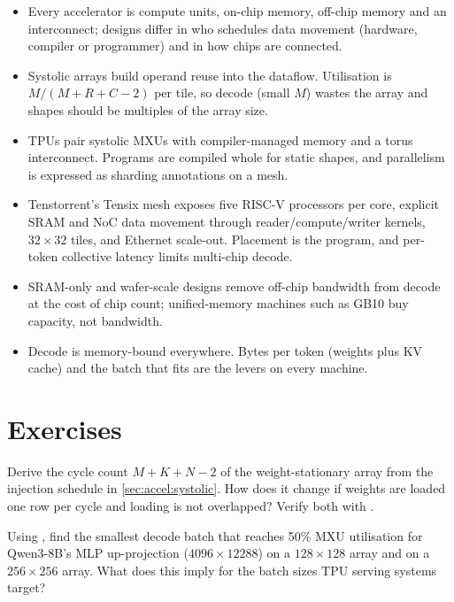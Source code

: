\begin{itemize}
  \item Every accelerator is compute units, on-chip memory, off-chip memory and an interconnect;
    designs differ in who schedules data movement (hardware, compiler or programmer) and in how chips
    are connected.
  \item Systolic arrays build operand reuse into the dataflow. Utilisation is $M/(M+R+C-2)$ per tile,
    so decode (small $M$) wastes the array and shapes should be multiples of the array size.
  \item TPUs pair systolic MXUs with compiler-managed memory and a torus interconnect. Programs are
    compiled whole for static shapes, and parallelism is expressed as sharding annotations on a mesh.
  \item Tenstorrent's Tensix mesh exposes five RISC-V processors per core, explicit SRAM and NoC data
    movement through reader/compute/writer kernels, $32\times32$ tiles, and Ethernet scale-out.
    Placement is the program, and per-token collective latency limits multi-chip decode.
  \item SRAM-only and wafer-scale designs remove off-chip bandwidth from decode at the cost of chip
    count; unified-memory machines such as GB10 buy capacity, not bandwidth.
  \item Decode is memory-bound everywhere. Bytes per token (weights plus KV cache) and the batch that
    fits are the levers on every machine.
\end{itemize}

\section{Exercises}\label{sec:accel:exercises}

\begin{exercise}
Derive the cycle count $M+K+N-2$ of the weight-stationary array from the injection schedule in
\cref{sec:accel:systolic}. How does it change if weights are loaded one row per cycle and loading
is not overlapped? Verify both with .
\end{exercise}

\begin{exercise}
Using , find the smallest decode batch that reaches 50\% MXU
utilisation for Qwen3-8B's MLP up-projection ($4096\times12288$) on a $128\times128$ array and on a
$256\times256$ array. What does this imply for the batch sizes TPU serving systems target?
\end{exercise}

